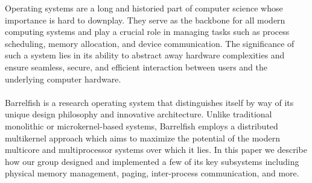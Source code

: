 Operating systems are a long and historied part of computer science whose importance is hard to downplay. They serve as the backbone for all modern computing systems and play a crucial role in managing tasks such as process scheduling, memory allocation, and device communication. The significance of such a system lies in its ability to abstract away hardware complexities and ensure seamless, secure, and efficient interaction between users and the underlying computer hardware.
\\\\
Barrelfish is a research operating system that distinguishes itself by way of its unique design philosophy and innovative architecture. Unlike traditional monolithic or microkernel-based systems, Barrelfish employs a distributed multikernel approach which aims to maximize the potential of the modern multicore and multiprocessor systems over which it lies. In this paper we describe how our group designed and implemented a few of its key subsystems including physical memory management, paging, inter-process communication, and more.

